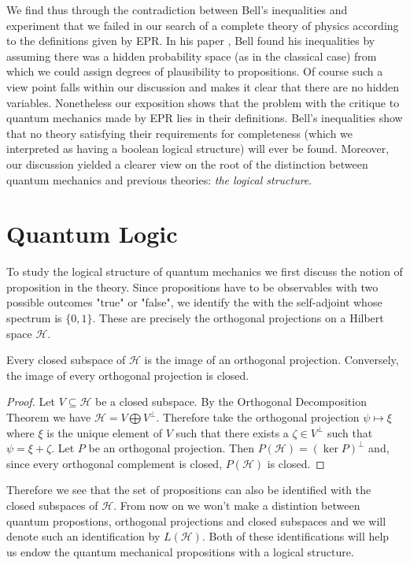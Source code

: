We find thus through the contradiction between Bell's inequalities and experiment that we failed in our search of a complete theory of physics according to the definitions given by EPR. In his paper \cite{Bell1964}, Bell found his inequalities by assuming there was a hidden probability space (as in the classical case) from which we could assign degrees of plausibility to propositions. Of course such a view point falls within our discussion and makes it clear that there are no hidden variables. Nonetheless our exposition shows that the problem with the critique to quantum mechanics made by EPR lies in their definitions. Bell's inequalities show that no theory satisfying their requirements for completeness (which we interpreted as having a boolean logical structure) will ever be found. Moreover, our discussion yielded a clearer view on the root of the distinction between quantum mechanics and previous theories: \textit{the logical structure}.

\section{Quantum Logic}

To study the logical structure of quantum mechanics we first discuss the notion of proposition in the theory. Since propositions have to be observables with two possible outcomes "true" or "false", we identify the with the self-adjoint whose spectrum is $\{0,1\}$. These are precisely the orthogonal projections on a Hilbert space $\mathcal{H}$.

\begin{theorem}
Every closed subspace of $\mathcal{H}$ is the image of an orthogonal projection. Conversely, the image of every orthogonal projection is closed.
\end{theorem}
\begin{proof}
Let $V\subseteq\mathcal{H}$ be a closed subspace.  By the Orthogonal Decomposition Theorem we have $\mathcal{H}=V\bigoplus V^{\bot}$. Therefore take the orthogonal projection $\psi\mapsto\xi$ where $\xi$ is the unique element of $V$ such that there exists a $\zeta\in V^{\bot}$ such that $\psi=\xi+\zeta$.
Let $P$ be an orthogonal projection. Then $P(\mathcal{H})=(\ker P)^{\bot}$ and, since every orthogonal complement is closed, $P(\mathcal{H})$ is closed.
\end{proof}

Therefore we see that the set of propositions can also be identified with the closed subspaces of $\mathcal{H}$. From now on we won't make a distintion between quantum propostions, orthogonal projections and closed subspaces and we will denote such an identification by $L(\mathcal{H})$. Both of these identifications will help us endow the quantum mechanical propositions with a logical structure.

